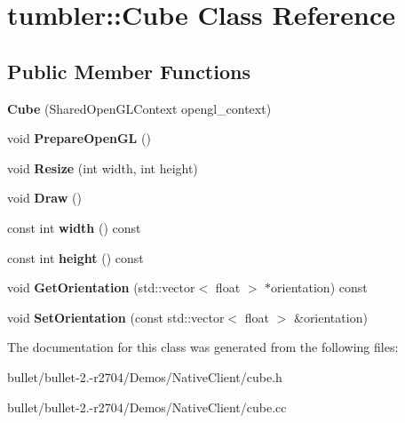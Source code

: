 \hypertarget{classtumbler_1_1_cube}{\section{tumbler\+:\+:Cube Class Reference}
\label{classtumbler_1_1_cube}
}
\subsection*{Public Member Functions}
\begin{DoxyCompactItemize}
\item 
\hypertarget{classtumbler_1_1_cube_a5f18b968375aba29be50f7b01fc227ee}{{\bfseries Cube} (Shared\+Open\+G\+L\+Context opengl\+\_\+context)}\label{classtumbler_1_1_cube_a5f18b968375aba29be50f7b01fc227ee}

\item 
\hypertarget{classtumbler_1_1_cube_a62b97b480f8cbccf49cfe650c19590ec}{void {\bfseries Prepare\+Open\+G\+L} ()}\label{classtumbler_1_1_cube_a62b97b480f8cbccf49cfe650c19590ec}

\item 
\hypertarget{classtumbler_1_1_cube_aa618965575cca4ce046576220d7e45d7}{void {\bfseries Resize} (int width, int height)}\label{classtumbler_1_1_cube_aa618965575cca4ce046576220d7e45d7}

\item 
\hypertarget{classtumbler_1_1_cube_aa5004f01ce9403a31e1fb601efacfdde}{void {\bfseries Draw} ()}\label{classtumbler_1_1_cube_aa5004f01ce9403a31e1fb601efacfdde}

\item 
\hypertarget{classtumbler_1_1_cube_ab943f389a373cb1388662e5f6a6b784e}{const int {\bfseries width} () const }\label{classtumbler_1_1_cube_ab943f389a373cb1388662e5f6a6b784e}

\item 
\hypertarget{classtumbler_1_1_cube_ab00828281d24db3ce0065cb52f253938}{const int {\bfseries height} () const }\label{classtumbler_1_1_cube_ab00828281d24db3ce0065cb52f253938}

\item 
\hypertarget{classtumbler_1_1_cube_ae4edb6a4de6cefed0d89efd7ed57e253}{void {\bfseries Get\+Orientation} (std\+::vector$<$ float $>$ $\ast$orientation) const }\label{classtumbler_1_1_cube_ae4edb6a4de6cefed0d89efd7ed57e253}

\item 
\hypertarget{classtumbler_1_1_cube_a30a9a8461b2778ee63c4badfa0c5a4ab}{void {\bfseries Set\+Orientation} (const std\+::vector$<$ float $>$ \&orientation)}\label{classtumbler_1_1_cube_a30a9a8461b2778ee63c4badfa0c5a4ab}

\end{DoxyCompactItemize}


The documentation for this class was generated from the following files\+:\begin{DoxyCompactItemize}
\item 
bullet/bullet-\/2.-\/r2704/\+Demos/\+Native\+Client/cube.\+h\item 
bullet/bullet-\/2.-\/r2704/\+Demos/\+Native\+Client/cube.\+cc\end{DoxyCompactItemize}
